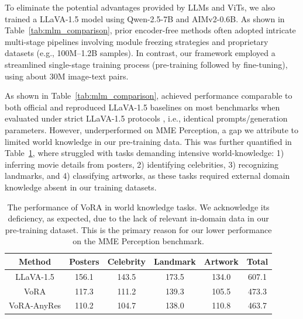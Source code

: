 To eliminate the potential advantages provided by LLMs and ViTs, we also trained a LLaVA-1.5 model using Qwen-2.5-7B and AIMv2-0.6B. As shown in Table~\ref{tab:mlm_comparison}, prior encoder-free methods often adopted intricate multi-stage pipelines involving module freezing strategies and proprietary datasets (e.g., 100M–1.2B samples). In contrast, our framework employed a streamlined single-stage training process (pre-training followed by fine-tuning), using about 30M image-text pairs. 

As shown in Table~\ref{tab:mlm_comparison}, \model{} achieved performance comparable to both official and reproduced LLaVA-1.5 baselines on most benchmarks when evaluated under strict LLaVA-1.5 protocols \cite{llava1_5}, i.e., identical prompts/generation parameters. However, \model{} underperformed on MME Perception, a gap we attribute to limited world knowledge in our pre-training data. This was further quantified in Table~\ref{tab:world_knowledge}, where \model{} struggled with tasks demanding intensive world-knowledge: 1) inferring movie details from posters, 2) identifying celebrities, 3) recognizing landmarks, and 4) classifying artworks, as these tasks required external domain knowledge absent in our training datasets.

\begin{table}[]
    \centering
    \renewcommand{\arraystretch}{1.5}
    \small
    \setlength{\tabcolsep}{3pt}
    \begin{tabular}{c|cccc|c}
    \toprule
        Method & Posters & Celebrity & Landmark & Artwork & Total\\
        \midrule
        LLaVA-1.5 & 156.1 & 143.5 & 173.5 & 134.0 & 607.1\\
        \midrule
        VoRA & 117.3 & 111.2 & 139.3 & 105.5 & 473.3\\
        VoRA-AnyRes & 110.2 & 104.7 & 138.0 & 110.8 & 463.7\\
    \bottomrule
    \end{tabular}
    \caption{The performance of VoRA in world knowledge tasks. We acknowledge its deficiency, as expected, due to the lack of relevant in-domain data in our pre-training dataset. This is the primary reason for our lower performance on the MME Perception benchmark.}
    \label{tab:world_knowledge}
\end{table}